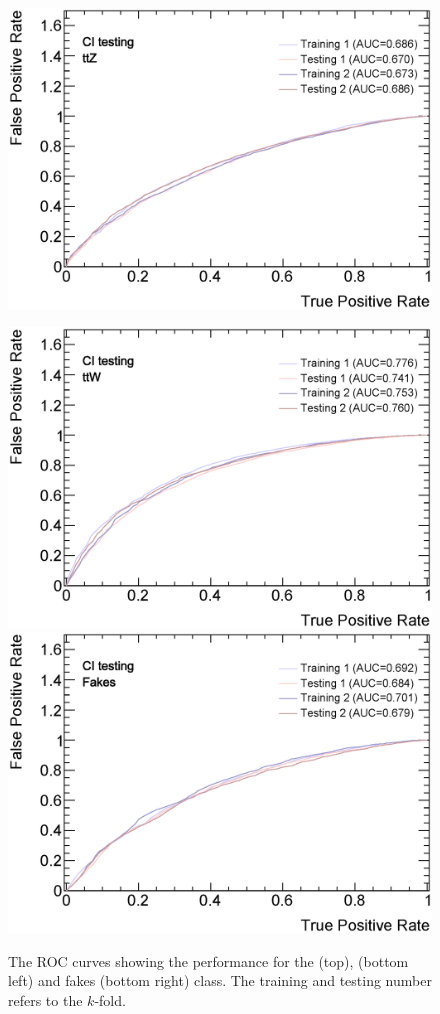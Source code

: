 \documentclass[bachelor,oneside, BCOR10mm,
			ngerman,english  %
]{GAUBM}
\begin{document}
\begin{figure}
	\centering
	\includegraphics[width=.42\textwidth]{figures/neural_networks/output/MyModel_ROCCurve_Combined_ttZ.eps}
	
	\includegraphics[width=.42\textwidth]{figures/neural_networks/output/MyModel_ROCCurve_Combined_ttW.eps}\hspace{8mm}
	\includegraphics[width=.42\textwidth]{figures/neural_networks/output/MyModel_ROCCurve_Combined_Fakes.eps}
	\caption{The ROC curves showing the performance for the \ttbarZ (top), \ttbarW (bottom left) and fakes (bottom right) class. The training and testing number refers to the $k$-fold.}
	\label{fig:nn_OutputROCCurves}
\end{figure}
%
%	
\end{document}

